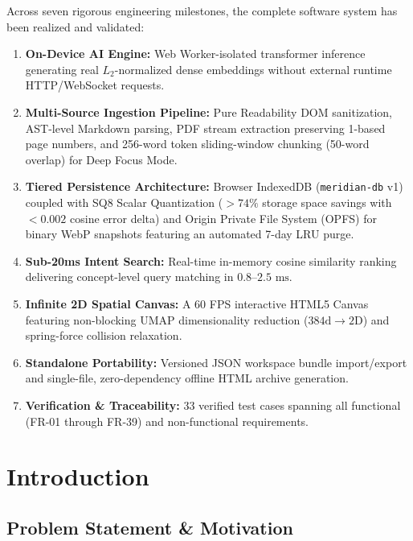 \documentclass{tietreport}
\begin{document}
Across seven rigorous engineering milestones, the complete software system has been realized and validated:
\begin{enumerate}
    \item \textbf{On-Device AI Engine:} Web Worker-isolated transformer inference generating real $L_2$-normalized dense embeddings without external runtime HTTP/WebSocket requests.
    \item \textbf{Multi-Source Ingestion Pipeline:} Pure Readability DOM sanitization, AST-level Markdown parsing, PDF stream extraction preserving 1-based page numbers, and 256-word token sliding-window chunking (50-word overlap) for Deep Focus Mode.
    \item \textbf{Tiered Persistence Architecture:} Browser IndexedDB (\texttt{meridian-db} v1) coupled with SQ8 Scalar Quantization ($>74\%$ storage space savings with $<0.002$ cosine error delta) and Origin Private File System (OPFS) for binary WebP snapshots featuring an automated 7-day LRU purge.
    \item \textbf{Sub-20ms Intent Search:} Real-time in-memory cosine similarity ranking delivering concept-level query matching in $0.8\text{--}2.5\text{ ms}$.
    \item \textbf{Infinite 2D Spatial Canvas:} A 60 FPS interactive HTML5 Canvas featuring non-blocking UMAP dimensionality reduction ($384\text{d} \to 2\text{D}$) and spring-force collision relaxation.
    \item \textbf{Standalone Portability:} Versioned JSON workspace bundle import/export and single-file, zero-dependency offline HTML archive generation.
    \item \textbf{Verification \& Traceability:} 33 verified test cases spanning all functional (FR-01 through FR-39) and non-functional requirements.
\end{enumerate}


\chapter{Introduction}

\section{Problem Statement \& Motivation}
\end{document}

